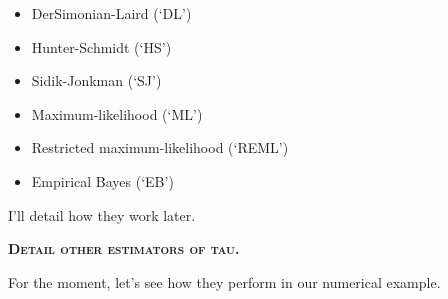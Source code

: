 \documentclass[]{book}
\providecommand{\tightlist}{%
  \setlength{\itemsep}{0pt}\setlength{\parskip}{0pt}}
\theoremstyle{definition}
\theoremstyle{definition}
\theoremstyle{definition}
\theoremstyle{remark}
\let\BeginKnitrBlock\begin \let\EndKnitrBlock\end
\begin{document}
\begin{itemize}
\tightlist
\item
  DerSimonian-Laird (`DL')
\item
  Hunter-Schmidt (`HS')
\item
  Sidik-Jonkman (`SJ')
\item
  Maximum-likelihood (`ML')
\item
  Restricted maximum-likelihood (`REML')
\item
  Empirical Bayes (`EB')
\end{itemize}

I'll detail how they work later.

\textbf{\textsc{Detail other estimators of tau.}}

\BeginKnitrBlock{example}
\protect\hypertarget{exm:unnamed-chunk-155}{}{\label{exm:unnamed-chunk-155}
}For the moment, let's see how they perform in our numerical example.
\EndKnitrBlock{example}
\end{document}
